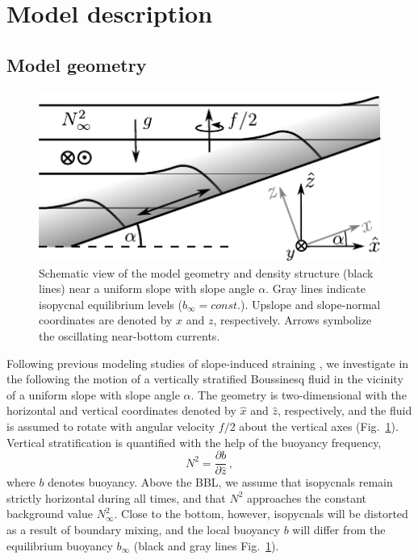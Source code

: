 \section{Model description}\label{modeldescription}

\subsection{Model geometry}\label{modelgeometry}

\begin{figure}
  \noindent\includegraphics[width=30pc]{geometry.pdf}
  \caption{Schematic view of the model geometry and density structure
    (black lines) near a uniform slope with slope angle $\alpha$. Gray
    lines indicate isopycnal equilibrium levels ($b_\infty =
    const.$). Upslope and slope-normal coordinates are denoted by $x$
    and $z$, respectively. Arrows symbolize the oscillating
    near-bottom currents.}
  \label{geometry}
\end{figure}

Following previous modeling studies of slope-induced straining
\citep{UmlaufBurchard2011a,schulzumlauf2016}, we investigate in the
following the motion of a vertically stratified Boussinesq fluid in
the vicinity of a uniform slope with slope angle $\alpha$. The
geometry is two-dimensional with the horizontal and vertical
coordinates denoted by $\hat{x}$ and $\hat{z}$, respectively, and the
fluid is assumed to rotate with angular velocity $f / 2$ about the
vertical axes (Fig.\ \ref{geometry}). Vertical stratification is
quantified with the help of the buoyancy frequency,
\begin{equation}
  \label{N2}
  N^2 = \frac{\partial b}{\partial \hat{z}} \, ,
\end{equation}
where $b$ denotes buoyancy. Above the BBL, we assume that isopycnals
remain strictly horizontal during all times, and that $N^2$ approaches
the constant background value $N^2_\infty$. Close to the bottom,
however, isopycnals will be distorted as a result of boundary mixing,
and the local buoyancy $b$ will differ from the equilibrium buoyancy
$b_\infty$ (black and gray lines Fig.\ \ref{geometry}).

